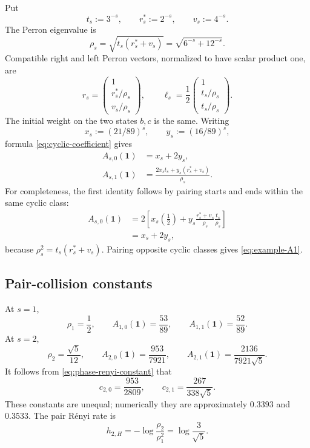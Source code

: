 Put
\[
  t_s:=3^{-s},\qquad r_s^*:=2^{-s},\qquad v_s:=4^{-s}.
\]
The Perron eigenvalue is
\begin{equation}
  \rho_s=\sqrt{t_s(r_s^*+v_s)}
  =\sqrt{6^{-s}+12^{-s}}.
  \label{eq:example-rhos}
\end{equation}
Compatible right and left Perron vectors, normalized to have scalar
product one, are
\begin{equation}
  r_s=
  \begin{pmatrix}
    1\\ r_s^*/\rho_s\\ v_s/\rho_s
  \end{pmatrix},
  \qquad
  \ell_s=\frac12
  \begin{pmatrix}
    1\\ t_s/\rho_s\\ t_s/\rho_s
  \end{pmatrix}.
  \label{eq:example-perron-vectors}
\end{equation}
The initial weight on the two states \(b,c\) is the same.  Writing
\[
  x_s:=(21/89)^s,
  \qquad
  y_s:=(16/89)^s,
\]
formula \eqref{eq:cyclic-coefficient} gives
\begin{align}
  A_{s,0}(\mathbf1)
  &=x_s+2y_s,
  \label{eq:example-A0}\\
  A_{s,1}(\mathbf1)
  &=\frac{2x_st_s+y_s(r_s^*+v_s)}{\rho_s}.
  \label{eq:example-A1}
\end{align}
For completeness, the first identity follows by pairing starts and ends
within the same cyclic class:
\begin{align*}
 A_{s,0}(\mathbf1)
 &=2\left[
     x_s\left(\frac12\right)
     +y_s\frac{r_s^*+v_s}{\rho_s}
       \frac{t_s}{\rho_s}
   \right]\\
 &=x_s+2y_s,
\end{align*}
because \(\rho_s^2=t_s(r_s^*+v_s)\).  Pairing opposite cyclic classes
gives \eqref{eq:example-A1}.

\subsection{Pair-collision constants}

At \(s=1\),
\[
  \rho_1=\frac12,
  \qquad
  A_{1,0}(\mathbf1)=\frac{53}{89},
  \qquad
  A_{1,1}(\mathbf1)=\frac{52}{89}.
\]
At \(s=2\),
\[
  \rho_2=\frac{\sqrt5}{12},
  \qquad
  A_{2,0}(\mathbf1)=\frac{953}{7921},
  \qquad
  A_{2,1}(\mathbf1)=\frac{2136}{7921\sqrt5}.
\]
It follows from \eqref{eq:phase-renyi-constant} that
\begin{equation}
  c_{2,0}=\frac{953}{2809},
  \qquad
  c_{2,1}=\frac{267}{338\sqrt5}.
  \label{eq:example-collision-constants}
\end{equation}
These constants are unequal; numerically they are approximately
\(0.3393\) and \(0.3533\).  The pair R\'enyi rate is
\begin{equation}
  h_{2,H}
  =-\log\frac{\rho_2}{\rho_1^2}
  =\log\frac3{\sqrt5}.
  \label{eq:example-h2}
\end{equation}

